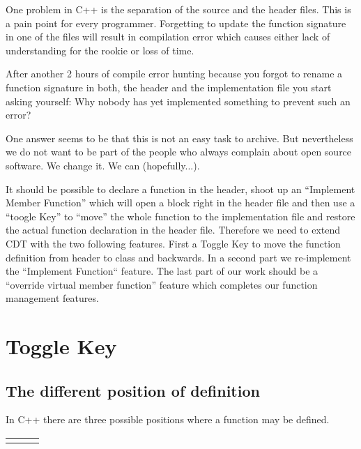 \documentclass[a4paper,10pt,abstract=on]{scrreprt}
\begin{document}
One  problem in C++ is the separation of the source and the header files. This is a pain point for every programmer. Forgetting to update the function signature in one of the files will result in compilation error which causes either lack of understanding for the rookie or loss of time.

After another 2 hours of compile error hunting because you forgot to rename a function signature in both, the header and the implementation file you start asking yourself: Why nobody has yet implemented something to prevent such an error?

One answer seems to be that this is not an easy task to archive. But nevertheless we do not want to be part of the people who always complain about open source software. We change it. We can (hopefully...).

It should be possible to declare a function in the header, shoot up an ``Implement Member Function'' which will open a block right in the header file and then use a ``toogle Key'' to ``move'' the whole function to the implementation file and restore the actual function declaration in the header file. Therefore we need to extend CDT with the two following features. First a Toggle Key to move the function definition from header to class and backwards. In a second part we re-implement the ``Implement Function`` feature. The last part of our work should be a ``override virtual member function'' feature which completes our function management features.

\section{Toggle Key}

\subsection{The different position of definition}

In C++ there are three possible positions where a function may be defined.




\begin{tabular}{p{5cm}p{.5cm}p{6cm}}

& &

\end{tabular}
\end{document}

